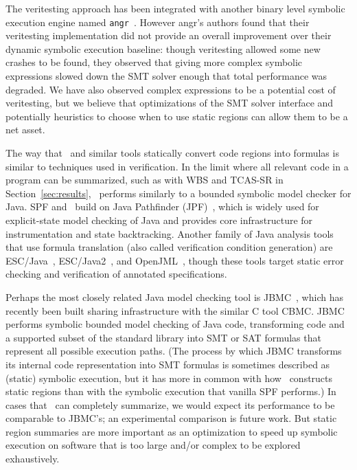 The veritesting approach has been integrated with another binary level
symbolic execution engine named {\tt angr}~\cite{angr}.
%
However angr's authors found that their veritesting implementation did
not provide an overall improvement over their dynamic symbolic
execution baseline: though veritesting allowed some new crashes to be
found, they observed that giving more complex symbolic expressions
slowed down the SMT solver enough that total performance was degraded.
%
We have also observed complex expressions to be a potential cost of
veritesting, but we believe that optimizations of the SMT solver
interface and potentially heuristics to choose when to use static
regions can allow them to be a net asset.

The way that \tool\ and similar tools statically convert code
regions into formulas is similar to techniques used in verification.
%
In the limit where all relevant code in a program can be
summarized, such as with WBS and TCAS-SR in Section~\ref{sec:results},
\tool\ performs similarly to a bounded symbolic model checker for
Java.
%
SPF and \tool\ build on Java Pathfinder (JPF)~\cite{jpf}, which is
widely used for explicit-state model checking of Java and provides
core infrastructure for instrumentation and state backtracking.
%
Another family of Java analysis tools that use formula translation
(also called verification condition generation) are
ESC/Java~\cite{FlanaganLLNSS2002}, ESC/Java2~\cite{CokK2004}, and
OpenJML~\cite{Cok2011}, though these tools target static error
checking and verification of annotated specifications.

Perhaps the most closely related Java model checking tool is
JBMC~\cite{CordeiroKKST2018}, which has recently been built sharing
infrastructure with the similar C tool CBMC.
%
JBMC performs symbolic bounded model checking of Java code,
transforming code and a supported subset of the standard library into
SMT or SAT formulas that represent all possible execution paths.
%
(The process by which JBMC transforms its internal code representation
into SMT formulas is sometimes described as (static) symbolic
execution, but it has more in common with how \tool\ constructs static
regions than with the symbolic execution that vanilla SPF performs.)
%
In cases that \tool\ can completely summarize, we would expect its
performance to be comparable to JBMC's; an experimental comparison is
future work.
%
But static region summaries are more important as an optimization to
speed up symbolic execution on software that is too large and/or
complex to be explored exhaustively.

